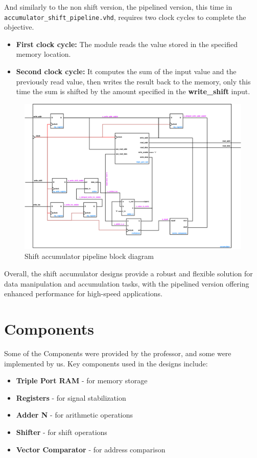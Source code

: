 \documentclass[a4paper,12pt]{article}
\begin{document}
And similarly to the  non shift version, the pipelined version, this time in \texttt{accumulator\_shift\_pipeline.vhd}, requires two clock cycles to complete the objective.
\begin{itemize}
    \item \textbf{First clock cycle:} The module reads the value stored in the specified memory location.
    \item \textbf{Second clock cycle:} It computes the sum of the input value and the previously read value, then writes the result back to the memory, only this time the sum is shifted by the amount specified in the \textbf{write\_shift} input.
\end{itemize}
\begin{figure}[H]
    \centering
    \includegraphics[width=1.0\linewidth]{accumulator_shift_pipeline.png}
    \caption{Shift accumulator pipeline block diagram}
    \label{fig:shift_pipeline}
\end{figure}

Overall, the shift accumulator designs provide a robust and flexible solution for data manipulation and accumulation tasks, with the pipelined version offering enhanced performance for high-speed applications.

\section{Components}
Some of the Components were provided by the professor, and some were 
implemented by us.
Key components used in the designs include:
\begin{itemize}
    \item \textbf{Triple Port RAM} - for memory storage
    \item \textbf{Registers} - for signal stabilization
    \item \textbf{Adder N} - for arithmetic operations
    \item \textbf{Shifter} - for shift operations
    \item \textbf{Vector Comparator} - for address comparison
\end{itemize}
\end{document}

